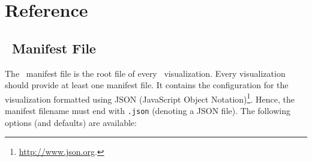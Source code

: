 \section{Reference}
\label{reference}

\subsection{\bms\ Manifest File}
\label{sec:manifest}

The \bms\ manifest file is the root file of every \bms\ visualization.
Every visualization should provide at least one manifest file.
It contains the configuration for the visualization formatted using JSON (JavaScript Object Notation)\footnote{\url{http://www.json.org}.}.
Hence, the manifest filename must end with \texttt{.json} (denoting a JSON file).
The following options (and defaults) are available:


